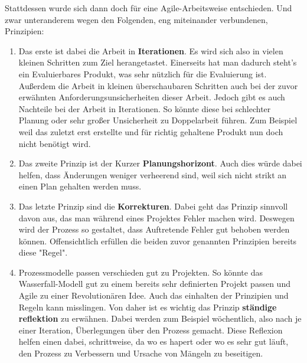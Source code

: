 \myNewSection
Stattdessen wurde sich dann doch für eine Agile-Arbeitsweise entschieden. Und zwar unteranderem wegen den Folgenden, eng miteinander verbundenen, Prinzipien:
	\begin{enumerate}
		\item Das erste ist dabei die Arbeit in \textbf{Iterationen}. Es wird sich also in vielen kleinen Schritten zum Ziel herangetastet. Einerseits hat man dadurch steht's ein Evaluierbares Produkt, was sehr nützlich für die Evaluierung ist. Außerdem die Arbeit in kleinen überschaubaren Schritten auch bei der zuvor erwähnten Anforderungsunsicherheiten dieser Arbeit. Jedoch gibt es auch Nachteile bei der Arbeit in Iterationen. So könnte diese bei schlechter Planung oder sehr großer Unsicherheit zu Doppelarbeit führen. Zum Beispiel weil das zuletzt erst erstellte und für richtig gehaltene Produkt nun doch nicht benötigt wird.
		\item Das zweite Prinzip ist der Kurzer \textbf{Planungshorizont}. Auch dies würde dabei helfen, dass Änderungen weniger verheerend sind, weil sich nicht strikt an einen Plan gehalten werden muss.
		\item Das letzte Prinzip sind die \textbf{Korrekturen}. Dabei geht das Prinzip sinnvoll davon aus, das man während eines Projektes Fehler machen wird. Deswegen wird der Prozess so gestaltet, dass Auftretende Fehler gut behoben werden können. Offensichtlich erfüllen die beiden zuvor genannten Prinzipien bereits diese "Regel".
		\item Prozessmodelle passen verschieden gut zu Projekten. So könnte das Wasserfall-Modell gut zu einem bereits sehr definierten Projekt passen und Agile zu einer Revolutionären Idee. Auch das einhalten der Prinzipien und Regeln kann misslingen. Von daher ist es wichtig das Prinzip \textbf{ständige reflektion} zu erwähnen. Dabei werden zum Beispiel wöchentlich, also nach je einer Iteration, Überlegungen über den Prozess gemacht. Diese Reflexion helfen einen dabei, schrittweise, da wo es hapert oder wo es sehr gut läuft, den Prozess zu Verbessern und Ursache von Mängeln zu beseitigen.
	\end{enumerate}
